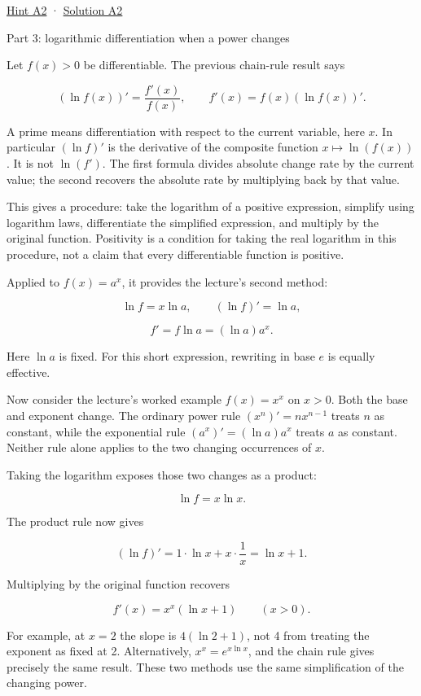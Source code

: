 \documentclass[
  11pt,
]{article}
\providecommand{\gt}{>}
\begin{document}
\protect\hyperlink{hint-a2}{Hint A2} ·
\protect\hyperlink{solution-a2}{Solution A2}

Part 3: logarithmic differentiation when a power changes

Let \(f(x)\gt 0\) be differentiable. The previous chain-rule result says

\[
(\ln f(x))'=\frac{f'(x)}{f(x)},\qquad
f'(x)=f(x)(\ln f(x))'.
\]

A prime means differentiation with respect to the current variable, here
\(x\). In particular \((\ln f)'\) is the derivative of the composite
function \(x\mapsto\ln(f(x))\). It is not \(\ln(f')\). The first formula
divides absolute change rate by the current value; the second recovers
the absolute rate by multiplying back by that value.

This gives a procedure: take the logarithm of a positive expression,
simplify using logarithm laws, differentiate the simplified expression,
and multiply by the original function. Positivity is a condition for
taking the real logarithm in this procedure, not a claim that every
differentiable function is positive.

Applied to \(f(x)=a^x\), it provides the lecture's second method:

\[
\ln f=x\ln a,\qquad (\ln f)'=\ln a,
\]

\[
f'=f\ln a=(\ln a)a^x.
\]

Here \(\ln a\) is fixed. For this short expression, rewriting in base
\(e\) is equally effective.

Now consider the lecture's worked example \(f(x)=x^x\) on \(x\gt 0\).
Both the base and exponent change. The ordinary power rule
\((x^n)'=nx^{n-1}\) treats \(n\) as constant, while the exponential rule
\((a^x)'=(\ln a)a^x\) treats \(a\) as constant. Neither rule alone
applies to the two changing occurrences of \(x\).

Taking the logarithm exposes those two changes as a product:

\[
\ln f=x\ln x.
\]

The product rule now gives

\[
(\ln f)'=1\cdot\ln x+x\cdot\frac1x=\ln x+1.
\]

Multiplying by the original function recovers

\[
f'(x)=x^x(\ln x+1)\qquad(x\gt 0).
\]

For example, at \(x=2\) the slope is \(4(\ln2+1)\), not 4 from treating
the exponent as fixed at 2. Alternatively, \(x^x=e^{x\ln x}\), and the
chain rule gives precisely the same result. These two methods use the
same simplification of the changing power.
\end{document}

